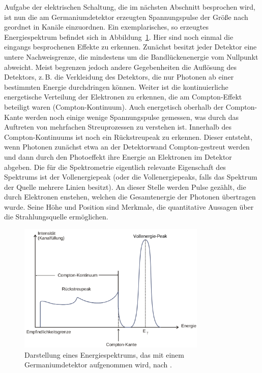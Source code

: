 Aufgabe der elektrischen Schaltung, die im nächsten Abschnitt besprochen wird, ist nun die am Germaniumdetektor erzeugten Spannungspulse der
Größe nach geordnet in Kanäle einzuordnen. Ein exemplarisches, so erzeugtes Energiespektrum befindet sich in
Abbildung~\ref{fig: example_spectrum}. Hier sind noch einmal die eingangs besprochenen Effekte zu erkennen. Zunächst besitzt jeder
Detektor eine untere Nachweisgrenze, die mindestens um die Bandlückenenergie vom Nullpunkt abweicht. Meist begrenzen jedoch
andere Gegebenheiten die Auflösung des Detektors, z.\,B. die Verkleidung des Detektors, die nur Photonen ab einer bestimmten Energie
durchdringen können. Weiter ist die kontinuierliche energetische Verteilung der Elektronen zu erkennen, die am Compton-Effekt
beteiligt waren (Compton-Kontinuum). Auch energetisch oberhalb der Compton-Kante werden noch einige wenige Spannungspulse gemessen,
was durch das Auftreten von mehrfachen Streuprozessen zu verstehen ist. Innerhalb des Compton-Kontinuums ist noch ein Rückstreupeak
zu erkennen. Dieser entsteht, wenn Photonen zunächst etwa an der Detektorwand Compton-gestreut werden und dann durch den
Photoeffekt ihre Energie an Elektronen im Detektor abgeben.
Die für die Spektrometrie eigentlich relevante Eigenschaft des Spektrums ist der Vollenergiepeak (oder die Vollenergiepeaks, falls
das Spektrum der Quelle mehrere Linien besitzt). An dieser Stelle werden Pulse gezählt, die durch Elektronen enstehen, welchen
die Gesamtenergie der Photonen übertragen wurde.
Seine Höhe und Position sind Merkmale, die quantitative Aussagen über die Strahlungsquelle ermöglichen.


\begin{figure}
\centering
\includegraphics[width = 0.8\textwidth]{pics/example_spectrum.pdf}
\caption{Darstellung eines Energiespektrums, das mit einem Germaniumdetektor aufgenommen wird, nach \cite{anleitungv18}.}
\label{fig: example_spectrum}
\end{figure}

